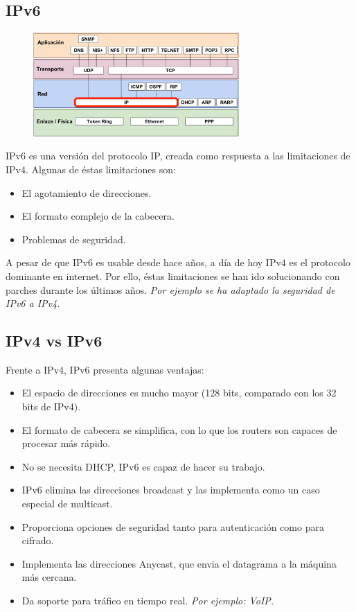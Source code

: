 \begin{onepage}
\section{IPv6}
\begin{figure}[H]
    \centering \includegraphics[width=0.7\textwidth]{img/IP.png}
\end{figure}
IPv6 es una versión del protocolo IP, creada como respuesta a las limitaciones de IPv4. Algunas de éstas limitaciones son:
\begin{itemize}
    \item El agotamiento de direcciones.
    \item El formato complejo de la cabecera.
    \item Problemas de seguridad.
\end{itemize}
A pesar de que IPv6 es usable desde hace años, a día de hoy IPv4 es el protocolo dominante en internet. Por ello, éstas limitaciones se han ido solucionando con parches durante los últimos años. \textit{Por ejemplo se ha adaptado la seguridad de IPv6 a IPv4.}
\subsection{IPv4 vs IPv6}
Frente a IPv4, IPv6 presenta algunas ventajas:
\begin{itemize}
    \item El espacio de direcciones es mucho mayor (128 bits, comparado con los 32 bits de IPv4).
    \item El formato de cabecera se simplifica, con lo que los routers son capaces de procesar más rápido.
    \item No se necesita DHCP, IPv6 es capaz de hacer su trabajo.
    \item IPv6 elimina las direcciones broadcast y las implementa como un caso especial de multicast.
    \item Proporciona opciones de seguridad tanto para autenticación como para cifrado.
    \item Implementa las direcciones Anycast, que envia el datagrama a la máquina más cercana.
    \item Da soporte para tráfico en tiempo real. \textit{Por ejemplo: VoIP.}
\end{itemize}
\end{onepage}
